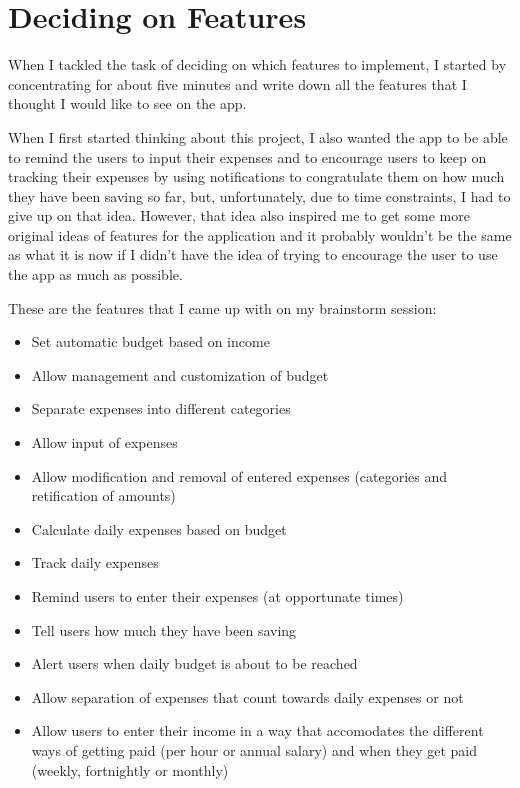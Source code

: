 \chapter{Deciding on Features}
When I tackled the task of deciding on which features to implement, I started by concentrating for about five minutes and write down all the features that I thought I would like to see on the app.

When I first started thinking about this project, I also wanted the app to be able to remind the users to input their expenses and to encourage users to keep on tracking their expenses by using notifications to congratulate them on how much they have been saving so far, but, unfortunately, due to time constraints, I had to give up on that idea. However, that idea also inspired me to get some more original ideas of features for the application and it probably wouldn't be the same as what it is now if I didn't have the idea of trying to encourage the user to use the app as much as possible.

These are the features that I came up with on my brainstorm session:

\begin{itemize}
  \item Set automatic budget based on income
  \item Allow management and customization of budget
  \item Separate expenses into different categories
  \item Allow input of expenses
  \item Allow modification and removal of entered expenses (categories and retification of amounts)
  \item Calculate daily expenses based on budget
  \item Track daily expenses
  \item Remind users to enter their expenses (at opportunate times)
  \item Tell users how much they have been saving
  \item Alert users when daily budget is about to be reached
  \item Allow separation of expenses that count towards daily expenses or not
  \item Allow users to enter their income in a way that accomodates the different ways of getting paid (per hour or annual salary) and when they get paid (weekly, fortnightly or monthly)
\end{itemize}

